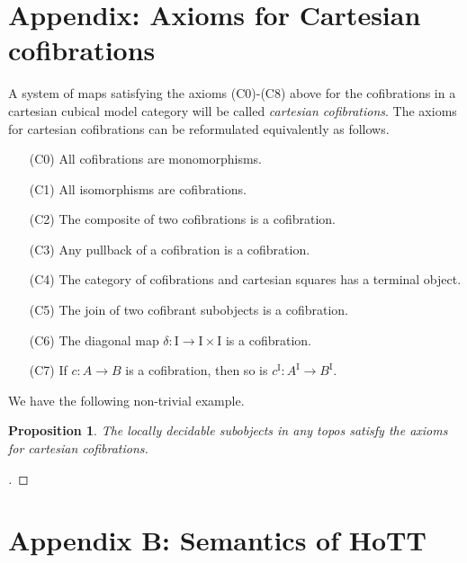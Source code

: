 \documentclass[12pt]{article}
\newcommand{\ednote}[1]{[\textit{\color{red}{#1}}]} %
\newcommand{\ra}{\ensuremath{\rightarrow}}
\renewcommand{\to}{\ensuremath{\rightarrow}}
\newcommand{\I}{\ensuremath{\mathrm{I}}}
\newtheorem{proposition}[theorem]{Proposition}
\theoremstyle{remark}
\theoremstyle{definition}
\begin{document}
\section*{Appendix: Axioms for Cartesian cofibrations}\label{appendix:Cofibrations}

A system of maps satisfying the axioms (C0)-(C8) above for the cofibrations in a cartesian cubical model category will be called \emph{cartesian cofibrations}. The axioms for cartesian cofibrations can be reformulated equivalently as follows.
\begin{enumerate}
\item[(C0)] All cofibrations are monomorphisms.
\item[(C1)] All isomorphisms are cofibrations.
\item[(C2)] The composite of two cofibrations is a cofibration.
\item[(C3)] Any pullback of a cofibration is a cofibration.
\item[(C4)] The category of cofibrations and cartesian squares has a terminal object.
\item[(C5)] The join of two cofibrant subobjects is a cofibration.
\item[(C6)] The diagonal map $\delta : \I\ra\I\times\I$ is a cofibration.
\item[(C7)] If $c:A \to B$ is a cofibration, then so is $c^\I:A^\I \to B^\I$.
\end{enumerate}

We have the following non-trivial example.
\begin{proposition}
The locally decidable subobjects in any topos satisfy the axioms for cartesian cofibrations.
\end{proposition}
\begin{proof}
\ednote{fill in ...}
\end{proof}
%
\section*{Appendix B: Semantics of HoTT}\label{appendix:HoTT}
%


%

\end{document}
